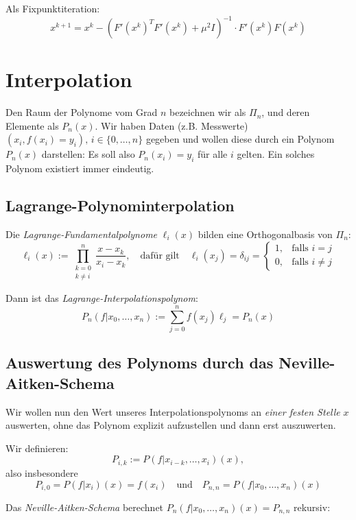 \documentclass[a4paper,parskip=half*,DIV=15,fontsize=11pt]{scrartcl}
\begin{document}
Als Fixpunktiteration:
\[ x^{k+1} = x^k - (F'(x^k)^T F'(x^k) + \mu^2 I)^{-1} \cdot F'(x^k) F(x^k) \]

\section{Interpolation}
Den Raum der Polynome vom Grad $n$ bezeichnen wir als $\Pi_n$, und deren Elemente als $P_n (x)$. Wir haben Daten (z.B. Messwerte) $(x_i,f(x_i) = y_i),\, i \in \{0,\ldots,n\}$ gegeben und wollen diese durch ein Polynom $P_n(x)$ darstellen: Es soll also $P_n(x_i) = y_i$ für alle $i$ gelten. Ein solches Polynom existiert immer eindeutig.

\subsection{Lagrange-Polynominterpolation}
Die \emph{Lagrange-Fundamentalpolynome} $\ell_i(x)$ bilden eine Orthogonalbasis von $\Pi_n$:
\[
  \ell_i(x) := \prod_{\substack{k = 0 \\ k \neq i}}^n \frac{x - x_k}{x_i - x_k},
  \quad\text{dafür gilt}\quad
  \ell_i(x_j) = \delta_{ij} = \begin{cases}
    1, &\text{falls } i = j \\
    0, &\text{falls } i \neq j
  \end{cases}
\]

Dann ist das \emph{Lagrange-Interpolationspolynom}:
\[ P_n(f|x_0,\ldots, x_n) := \sum_{j=0}^n f (x_j) \ell_j = P_n(x) \]

\subsection{Auswertung des Polynoms durch das Neville-Aitken-Schema}
Wir wollen nun den Wert unseres Interpolationspolynoms an \emph{einer festen Stelle} $x$ auswerten, ohne das Polynom explizit aufzustellen und dann erst auszuwerten.

Wir definieren:
\[ P_{i,k} := P(f|x_{i-k},\ldots,x_i)(x), \]
also insbesondere
\[ P_{i,0} = P(f|x_i)(x) = f(x_i) \quad\text{und}\quad P_{n,n} = P(f|x_0,\ldots,x_n)(x) \]

Das \emph{Neville-Aitken-Schema} berechnet $P_n(f|x_0,\ldots, x_n)(x) = P_{n,n}$ rekursiv:
\end{document}
